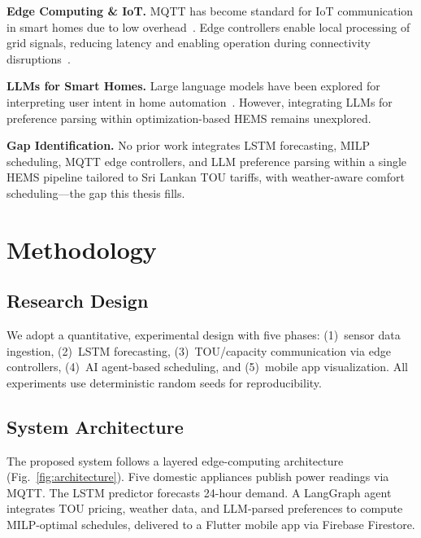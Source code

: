 \documentclass[10pt,a4paper,twocolumn]{article}
\begin{document}
\textbf{Edge Computing \& IoT.} MQTT has become standard for IoT communication in smart homes due to low overhead~\cite{naik2017}. Edge controllers enable local processing of grid signals, reducing latency and enabling operation during connectivity disruptions~\cite{zhou2016}.

\textbf{LLMs for Smart Homes.} Large language models have been explored for interpreting user intent in home automation~\cite{brown2020, king2023}. However, integrating LLMs for preference parsing within optimization-based HEMS remains unexplored.

\textbf{Gap Identification.} No prior work integrates LSTM forecasting, MILP scheduling, MQTT edge controllers, and LLM preference parsing within a single HEMS pipeline tailored to Sri Lankan TOU tariffs, with weather-aware comfort scheduling---the gap this thesis fills.

\section{Methodology}

\subsection{Research Design}
We adopt a quantitative, experimental design with five phases: (1)~sensor data ingestion, (2)~LSTM forecasting, (3)~TOU/capacity communication via edge controllers, (4)~AI agent-based scheduling, and (5)~mobile app visualization. All experiments use deterministic random seeds for reproducibility.

\subsection{System Architecture}
The proposed system follows a layered edge-computing architecture (Fig.~\ref{fig:architecture}). Five domestic appliances publish power readings via MQTT. The LSTM predictor forecasts 24-hour demand. A LangGraph agent integrates TOU pricing, weather data, and LLM-parsed preferences to compute MILP-optimal schedules, delivered to a Flutter mobile app via Firebase Firestore.
\end{document}
